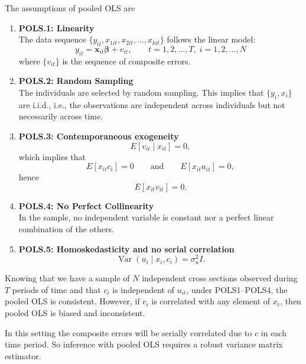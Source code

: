 \vspace{10pt}

The assumptions of pooled OLS are

\begin{enumerate}

    \item \textbf{POLS.1: Linearity} \\
    The data sequence $\{y_{it}, x_{1it}, x_{2it}, \ldots, x_{kit}\}$ follows the linear model:
    \[
    y_{it} = \mathbf{x}_{it}\boldsymbol{\beta} + v_{it}, 
    \qquad 
    t = 1,2,\ldots,T,\; i = 1,2,\ldots,N
    \]
    where $\{v_{it}\}$ is the sequence of composite errors.

    \item \textbf{POLS.2: Random Sampling} \\
    The individuals are selected by random sampling.  
    This implies that $\{y_i, x_i\}$ are i.i.d., i.e., the observations are independent across individuals but not necessarily across time.

    \item \textbf{POLS.3: Contemporaneous exogeneity} \\
    \[
    E[v_{it} \mid x_{it}] = 0,
    \]
    which implies that
    \[
    E[x_{it} c_i] = 0
    \qquad \text{and} \qquad
    E[x_{it} u_{it}] = 0,
    \]
    hence
    \[
    E[x_{it} v_{it}] = 0.
    \]

    \item \textbf{POLS.4: No Perfect Collinearity} \\
    In the sample, no independent variable is constant nor a perfect linear combination of the others.

    \item \textbf{POLS.5: Homoskedasticity and no serial correlation} \\
    \[
    \operatorname{Var}(u_i \mid x_i, c_i) = \sigma_u^2 I.
    \]

\end{enumerate}

Knowing that we have a sample of $N$ independent cross sections observed during $T$ periods
of time and that $c_i$ is independent of $u_{it}$, under POLS1--POLS4, the pooled OLS is
consistent. However, if $c_i$ is correlated with any element of $x_t$, then pooled OLS is
biased and inconsistent.

\vspace{10pt}

In this setting the composite errors will be serially correlated due to c in each time period. So inference with pooled OLS requires a robust variance matrix estimator. 


